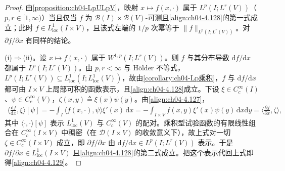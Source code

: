 \documentclass[../../main.tex]{subfiles}%
\begin{document}
\begin{proof}
由\cref{proposition:ch04-LpULpV}，映射 $x\mapsto f(x,\cdot)$ 属于 $L^p(I;L^r(V))$（$p,r\in[1,\infty)$）当且仅当 $f$ 为 $\mathcal{B}(I)\times\mathcal{B}(V)$-可测且\eqref{align:ch04-4.128}的第一式成立；此时 $f\in L^1_{\mathrm{loc}}(I\times V)$，且该式左端的 $1/p$ 次幂等于 $\|f\|_{L^p(I;L^r(V))}$。对 $\partial f/\partial x$ 有同样的结论。

(i)$\Rightarrow$(ii)。设 $x\mapsto f(x,\cdot)$ 属于 $W^{1,p}(I;L^r(V))$。则 $f$ 与其分布导数 $\mathrm{d}f/\mathrm{d}x$ 都属于 $L^p(I;L^r(V))$。由 $p,r<\infty$ 与 Hölder 不等式，$L^p(I;L^r(V))\subseteq L^1_{\mathrm{loc}}(I;L^1_{\mathrm{loc}}(V))$，故由\cref{corollary:ch04-Lp乘积}，$f$ 与 $\mathrm{d}f/\mathrm{d}x$ 都可由 $I\times V$ 上局部可积的函数表示，且\eqref{align:ch04-4.128}成立。下设 $\xi\in C_c^\infty(I)$、$\psi\in C_c^\infty(V)$，$\zeta(x,y)\triangleq\xi(x)\psi(y)$。由\eqref{align:ch04-4.127}，
\begin{align*}
\Big\langle\frac{\mathrm{d}f}{\mathrm{d}x},\xi\Big\rangle[\psi]=-\int_I\langle f(x,\cdot),\psi\rangle\xi'(x)\,\mathrm{d}x=-\int_{I\times V}f(x,y)\xi'(x)\psi(y)\,\mathrm{d}x\mathrm{d}y=\Big\langle\frac{\partial f}{\partial x},\zeta\Big\rangle ,
\end{align*}
其中 $\langle\cdot,\cdot\rangle[\psi]$ 表示 $L^1_{\mathrm{loc}}(V)$ 与 $C_c^\infty(V)$ 的配对。乘积型试验函数的有限线性组合在 $C_c^\infty(I\times V)$ 中稠密（在 $\mathcal{D}(I\times V)$ 的收敛意义下），故上式对一切 $\zeta\in C_c^\infty(I\times V)$ 成立，即 $\partial f/\partial x$ 由 $\mathrm{d}f/\mathrm{d}x\in L^p(I;L^r(V))$ 表示。于是 $\partial f/\partial x\in L^1_{\mathrm{loc}}(I\times V)$ 且\eqref{align:ch04-4.128}的第二式成立。把这个表示代回上式即得\eqref{align:ch04-4.129}。


\end{proof}
\end{document}
